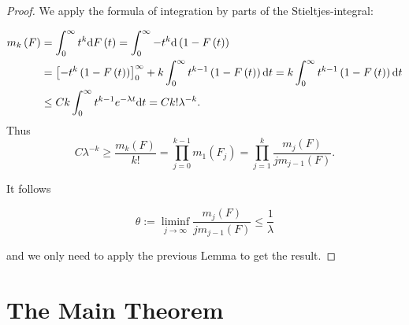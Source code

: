 \documentclass[12pt,a4paper]{scrartcl}
\numberwithin{equation}{section}
\begin{document}
\begin{proof}
We apply the formula of integration by parts of the Stieltjes-integral:

\begin{align*}
m_k\left(F\right) &= \int_0^{\infty} t^k \textnormal{d}F\left(t\right) = \int_0^{\infty} -t^k \textnormal{d}\left(1-F\left(t\right)\right) \\
&= \left[-t^k\left(1-F\left(t\right)\right)\right]_0^{\infty} + k\int_0^{\infty} t^{k-1}\left(1-F\left(t\right)\right) \textnormal{d}t = k\int_0^{\infty} t^{k-1}\left(1-F\left(t\right)\right) \textnormal{d}t \\
& \leq C k \int_0^{\infty} t^{k-1} e^{-\lambda t} \textnormal{d}t = Ck!\lambda^{-k}.
\end{align*}
Thus
\begin{equation*}
C\lambda^{-k} \geq \frac{m_k\left(F\right)}{k!} =\prod_{j=0}^{k-1} m_1\left(F_j\right) =\prod_{j=1}^{k} \frac{m_j\left(F\right)}{jm_{j-1}\left(F\right)}.
\end{equation*}

It follows

\begin{equation}
\theta := \liminf_{j \to \infty} \frac{m_j\left(F\right)}{j m_{j-1}\left(F\right)} \leq \frac{1}{\lambda} 
\end{equation}

and we only need to apply the previous Lemma to get the result.
\end{proof}



\newpage
\section{The Main Theorem}
\end{document}
